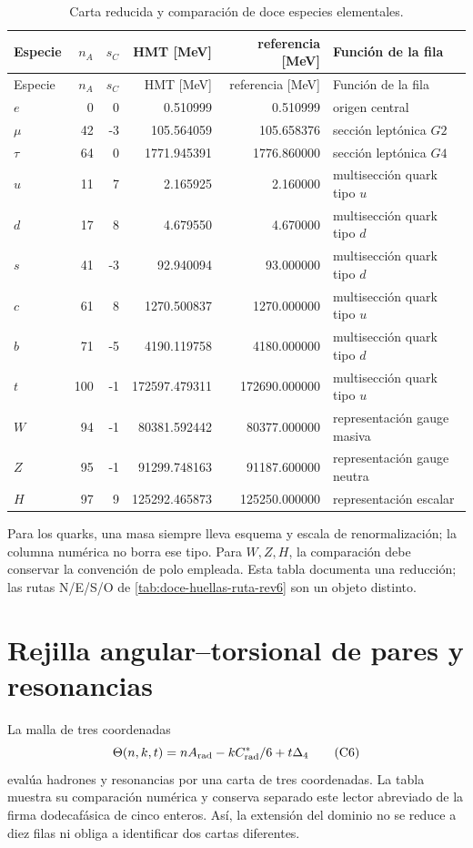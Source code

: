 \begin{longtable}{@{}lrrrrL{0.22\textwidth}@{}}
\caption{Carta reducida y comparación de doce especies elementales.}
\label{tab:doce-control-inverso-rev6}\\
\toprule
Especie&\(n_A\)&\(s_C\)&{HMT [MeV]}&{referencia [MeV]}&Función de la fila\\
\midrule
\endfirsthead
\toprule
Especie&\(n_A\)&\(s_C\)&{HMT [MeV]}&{referencia [MeV]}&Función de la fila\\
\midrule
\endhead
\(e\)&0&0&0.510999&0.510999&origen central\\
\(\mu\)&42&-3&105.564059&105.658376&sección leptónica \(G2\)\\
\(\tau\)&64&0&1771.945391&1776.860000&sección leptónica \(G4\)\\
\(u\)&11&7&2.165925&2.160000&multisección quark tipo \(u\)\\
\(d\)&17&8&4.679550&4.670000&multisección quark tipo \(d\)\\
\(s\)&41&-3&92.940094&93.000000&multisección quark tipo \(d\)\\
\(c\)&61&8&1270.500837&1270.000000&multisección quark tipo \(u\)\\
\(b\)&71&-5&4190.119758&4180.000000&multisección quark tipo \(d\)\\
\(t\)&100&-1&172597.479311&172690.000000&multisección quark tipo \(u\)\\
\(W\)&94&-1&80381.592442&80377.000000&representación gauge masiva\\
\(Z\)&95&-1&91299.748163&91187.600000&representación gauge neutra\\
\(H\)&97&9&125292.465873&125250.000000&representación escalar\\
\bottomrule
\end{longtable}

Para los quarks, una masa siempre lleva esquema y escala de
renormalización; la columna numérica no borra ese tipo. Para \(W,Z,H\), la
comparación debe conservar la convención de polo empleada. Esta tabla
documenta una reducción; las rutas N/E/S/O de
\cref{tab:doce-huellas-ruta-rev6} son un objeto distinto.

\section{Rejilla angular--torsional de pares y resonancias}

La malla de tres coordenadas
\[
\Theta(n,k,t)
=nA_{\rm rad}-k\frac{C^*_{\rm rad}}6+t\Delta_4
\tag{C6}\label{eq:malla-extendida-resonancias-rev6}
\]
evalúa hadrones y resonancias por una carta de tres coordenadas. La tabla
muestra su comparación numérica y conserva separado este lector abreviado de
la firma dodecafásica de cinco enteros. Así, la extensión del dominio no se
reduce a diez filas ni obliga a identificar dos cartas diferentes.

